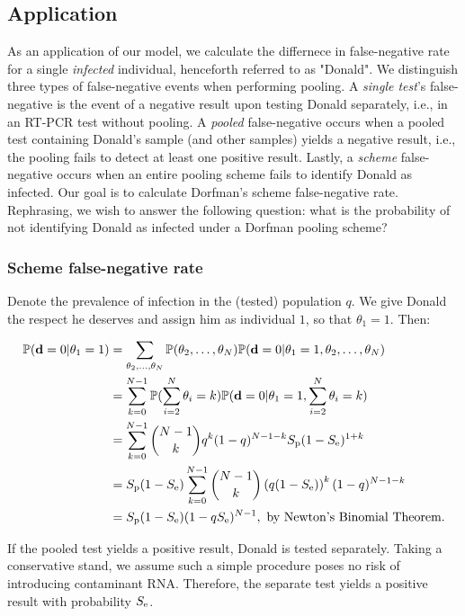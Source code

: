 \documentclass{article}
\begin{document}
\subsection{Application}
As an application of our model, we calculate the differnece in
false-negative rate for a single \emph{infected} individual,
henceforth referred to as "Donald".  We distinguish three types of
false-negative events when performing pooling. A \emph{single test}'s
false-negative is the event of a negative result upon testing Donald
separately, i.e., in an RT-PCR test without pooling. A \emph{pooled}
false-negative occurs when a pooled test containing Donald's sample
(and other samples) yields a negative result, i.e., the pooling fails
to detect at least one positive result. Lastly, a \emph{scheme}
false-negative occurs when an entire pooling scheme fails to identify
Donald as infected. Our goal is to calculate Dorfman's scheme
false-negative rate. Rephrasing, we wish to answer the following
question: what is the probability of not identifying Donald as
infected under a Dorfman pooling scheme?

\subsubsection{Scheme false-negative rate}
Denote the prevalence of infection in the (tested) population $q$. We
give Donald the respect he deserves and assign him as individual $1$,
so that $\theta_1=1$. Then:

\begin{align}
  \begin{split}
    \mathbb{P}(\mathbf{d}=0|\theta_1=1) &= \sum_{\theta_2,\dots,\theta_N} \mathbb{P}(\theta_2,\dots,\theta_N) \mathbb{P}(\mathbf{d}=0|\theta_1=1,\theta_2,\dots,\theta_N) \\
    &= \sum_{k=0}^{N-1}\mathbb{P}(\sum_{i=2}^N\theta_i=k)\mathbb{P}(\mathbf{d}=0|\theta_1=1,\sum_{i=2}^N\theta_i = k)\\
    &= \sum_{k=0}^{N-1}\binom{N-1}{k}q^k(1-q)^{N-1-k} S_\text{p}(1-S_\text{e})^{1+k}\\
    &= S_\text{p}(1-S_\text{e}) \sum_{k=0}^{N-1}\binom{N-1}{k}\left(q(1-S_\text{e})\right)^k(1-q)^{N-1-k}\\
    &= S_\text{p}(1-S_\text{e})(1-qS_\text{e})^{N-1}, \text{ by Newton's Binomial Theorem.} \\
  \end{split}
\end{align}

If the pooled test yields a positive result, Donald is tested
separately. Taking a conservative stand, we assume such a simple
procedure poses no risk of introducing contaminant RNA. Therefore, the
separate test yields a positive result with probability $S_\text{e}$.
\end{document}
